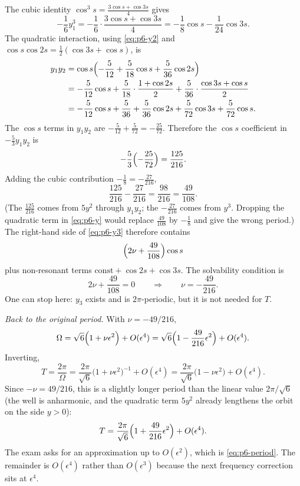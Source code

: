 \documentclass[11pt,a4paper]{article}
\begin{document}
The cubic identity \(\cos^{3}s=\frac{3\cos s+\cos 3s}{4}\) gives
\[
-\frac16 y_{1}^{3}
=
-\frac16\cdot\frac{3\cos s+\cos 3s}{4}
=
-\frac18\cos s-\frac{1}{24}\cos 3s.
\]
The quadratic interaction, using \eqref{eq:p6-y2} and \(\cos s\cos 2s=\frac12(\cos 3s+\cos s)\), is
\begin{align*}
y_{1}y_{2}
&=
\cos s\Bigl(-\frac{5}{12}+\frac{5}{18}\cos s+\frac{5}{36}\cos 2s\Bigr)
\\
&=
-\frac{5}{12}\cos s+\frac{5}{18}\cdot\frac{1+\cos 2s}{2}+\frac{5}{36}\cdot\frac{\cos 3s+\cos s}{2}
\\
&=
-\frac{5}{12}\cos s+\frac{5}{36}+\frac{5}{36}\cos 2s+\frac{5}{72}\cos 3s+\frac{5}{72}\cos s.
\end{align*}
The \(\cos s\) terms in \(y_{1}y_{2}\) are \(-\frac{5}{12}+\frac{5}{72}=-\frac{25}{72}\). Therefore the \(\cos s\) coefficient in \(-\frac53 y_{1}y_{2}\) is
\[
-\frac53\Bigl(-\frac{25}{72}\Bigr)
=
\frac{125}{216}.
\]
Adding the cubic contribution \(-\frac18=-\frac{27}{216}\),
\[
\frac{125}{216}-\frac{27}{216}
=
\frac{98}{216}
=
\frac{49}{108}.
\]
(The \(\frac{125}{216}\) comes from \(5y^{2}\) through \(y_{1}y_{2}\); the \(-\frac{27}{216}\) comes from \(y^{3}\). Dropping the quadratic term in \eqref{eq:p6-y} would replace \(\frac{49}{108}\) by \(-\frac18\) and give the wrong period.) The right-hand side of \eqref{eq:p6-y3} therefore contains
\[
\Bigl(2\nu+\frac{49}{108}\Bigr)\cos s
\]
plus non-resonant terms \(\mathrm{const}+\cos 2s+\cos 3s\). The solvability condition is
\[
2\nu+\frac{49}{108}=0
\qquad\Longrightarrow\qquad
\nu=-\frac{49}{216}.
\]
One can stop here: \(y_{3}\) exists and is \(2\pi\)-periodic, but it is not needed for \(T\).

\emph{Back to the original period.}
With \(\nu=-49/216\),
\[
\Omega
=
\sqrt{6}\Bigl(1+\nu\epsilon^{2}\Bigr)+O(\epsilon^{4})
=
\sqrt{6}\Bigl(1-\frac{49}{216}\epsilon^{2}\Bigr)+O(\epsilon^{4}).
\]
Inverting,
\[
T
=
\frac{2\pi}{\Omega}
=
\frac{2\pi}{\sqrt{6}}\bigl(1+\nu\epsilon^{2}\bigr)^{-1}+O(\epsilon^{4})
=
\frac{2\pi}{\sqrt{6}}\bigl(1-\nu\epsilon^{2}\bigr)+O(\epsilon^{4}).
\]
Since \(-\nu=49/216\), this is a slightly longer period than the linear value \(2\pi/\sqrt{6}\) (the well is anharmonic, and the quadratic term \(5y^{2}\) already lengthens the orbit on the side \(y>0\)):
\begin{equation}
\label{eq:p6-period}
T
=
\frac{2\pi}{\sqrt{6}}\Bigl(1+\frac{49}{216}\epsilon^{2}\Bigr)+O(\epsilon^{4}).
\end{equation}
The exam asks for an approximation up to \(O(\epsilon^{2})\), which is \eqref{eq:p6-period}. The remainder is \(O(\epsilon^{4})\) rather than \(O(\epsilon^{3})\) because the next frequency correction sits at \(\epsilon^{4}\).
\end{document}
